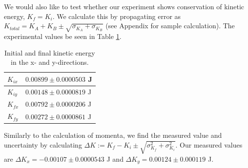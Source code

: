 \documentclass[11pt]{article}
\begin{document}
\begin{figure}[!h]
   \begin{floatrow}
   \end{floatrow}
\end{figure}

\begin{figure}[!h]
   \begin{floatrow}
   \end{floatrow}
\end{figure}

We would also like to test whether our experiment shows conservation of kinetic energy, $K_f = K_i$. We calculate this by propagating error as $K_{total} = K_A+K_B \pm \sqrt{\sigma_{K_A}+\sigma_{K_B}}$ (see Appendix for sample calculation). The experimental values be seen in Table \ref{tabkin}.

\begin{table}[]
\centering
\caption{Initial and final kinetic energy in the x- and y-directions.}
\label{tabkin}
\begin{tabular}{|l|l|}
\hline
$K_{ix}$ & $0.00899\pm0.0000503$ J  \\ \hline
$K_{iy}$ & $0.00148\pm 0.0000819$ J \\ \hline
$K_{fx}$ & $0.00792\pm 0.0000206$  J \\ \hline
$K_{fy}$ & $0.00272 \pm 0.0000861$  J\\ \hline
\end{tabular}
\end{table}

Similarly to the calculation of momenta, we find the measured value and uncertainty by calculating $\Delta K := K_{f}-K_{i} \pm \sqrt{\sigma_{K_{f}}^2+\sigma_{K_{i}}^2}$. Our measured values are $\Delta K_x = -0.00107 \pm 0.0000543$ J and $\Delta K_y = 0.00124\pm 0.000119$ J.
\end{document}
